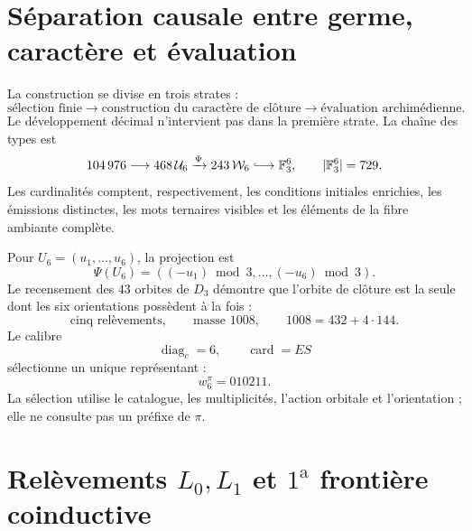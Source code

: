 
\label{gfp:b:chap:biografia-pi-autonoma}

\section{Séparation causale entre germe, caractère et évaluation}

La construction se divise en trois strates :
\[
 \text{sélection finie}
 \longrightarrow
 \text{construction du caractère de clôture}
 \longrightarrow
 \text{évaluation archimédienne}.
\]
Le développement décimal n’intervient pas dans la première strate. La chaîne des types
est
\begin{equation}
 104\,976
 \longrightarrow468\,\mathcal U_6
 \xrightarrow{\Psi}243\,\mathcal W_6
 \lhook\joinrel\longrightarrow\mathbb F_3^6,
 \qquad|\mathbb F_3^6|=729.
 \label{gfp:b:eq:cadena-tipica-pi-autonoma}
\end{equation}
Les cardinalités comptent, respectivement, les conditions initiales
enrichies, les émissions distinctes, les mots ternaires visibles et les éléments
de la fibre ambiante complète.

Pour \(U_6=(u_1,\ldots,u_6)\), la projection est
\[
 \Psi(U_6)=((-u_1)\bmod3,\ldots,(-u_6)\bmod3).
\]
Le recensement des \(43\) orbites de \(D_3\) démontre que l’orbite de
clôture est la seule dont les six orientations possèdent à la fois :
\[
 \text{cinq relèvements},\qquad
 \text{masse }1008,\qquad
 1008=432+4\cdot144.
\]
Le calibre
\[
 \operatorname{diag}_c=6,
 \qquad
 \operatorname{card}=ES
\]
sélectionne un unique représentant :
\begin{equation}
 \boxed{w_6^\pi=010211.}
 \label{gfp:b:eq:semilla-pi-autonoma}
\end{equation}
La sélection utilise le catalogue, les multiplicités, l’action orbitale et l’orientation ;
elle ne consulte pas un préfixe de \(\pi\).

\section{Relèvements \texorpdfstring{\(L_0,L_1\)}{L0, L1} et \(1^{\mathrm a}\) frontière coinductive}

